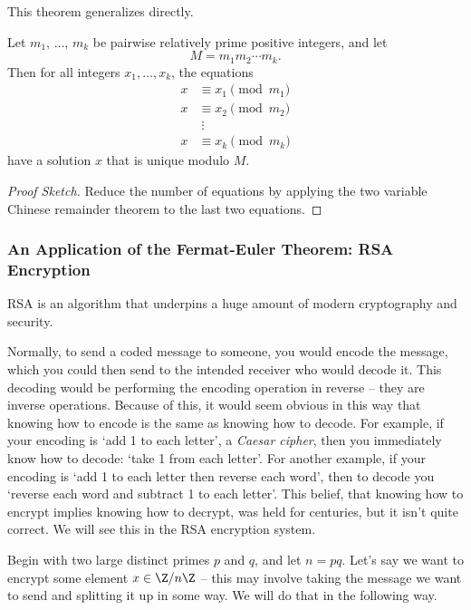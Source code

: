 This theorem generalizes directly.

\begin{theorem}
	Let $m_1$, $\dots$, $m_k$ be pairwise relatively prime positive integers, and let 
	$$M = m_1 m_2 \cdots m_k.
	$$ Then for all integers $x_1, \dots, x_k$, the equations
	\begin{align*}
		x & \equiv x_1 \pmod{m_1} \\
		x & \equiv x_2 \pmod{m_2} \\
			& \;\vdots \\
		x & \equiv x_k \pmod{m_k}
	\end{align*}
	have a solution $x$ that is unique modulo $M$.
\end{theorem}
\begin{proof}[Proof Sketch]
	Reduce the number of equations by applying the two variable Chinese remainder theorem to the last two equations.
\end{proof}

\subsubsection{An Application of the Fermat-Euler Theorem: RSA Encryption}

RSA is an algorithm that underpins a huge amount of modern cryptography and security. 

Normally, to send a coded message to someone, you would encode the message, which you could then send to the intended receiver who would decode it. This decoding would be performing the encoding operation in reverse -- they are inverse operations. Because of this, it would seem obvious in this way that knowing how to encode is the same as knowing how to decode.
For example, if your encoding is `add 1 to each letter', a \emph{
	Caesar cipher}, then you immediately know how to decode: `take 1 from each letter'.
	For another example, if your encoding is `add 1 to each letter then reverse each word', then to decode you `reverse each word and subtract 1 to each letter'. 
This belief, that knowing how to encrypt implies knowing how to decrypt, was held for centuries, but it isn't quite correct. We will see this in the RSA encryption system.

Begin with two large distinct primes $p$ and $q$, and let $n = pq$. Let's say we want to encrypt some element $x \in \Z/n\Z$ -- this may involve taking the message we want to send and splitting it up in some way. We will do that in the following way.

